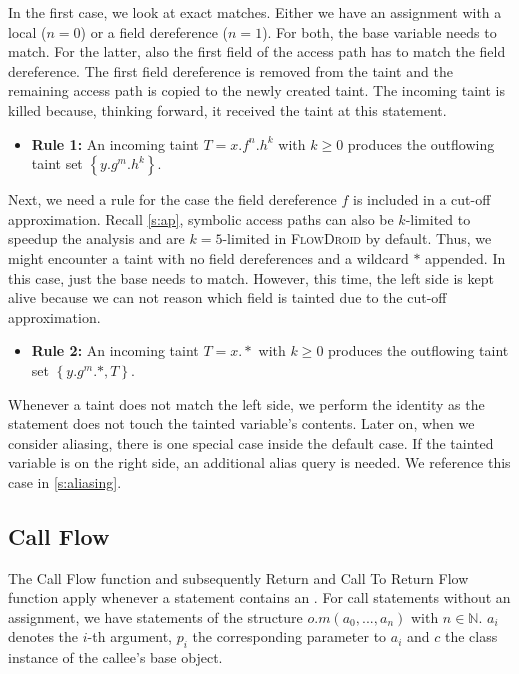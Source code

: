 \documentclass[../draft.tex]{subfiles}
\begin{document}
    In the first case, we look at exact matches. Either we have an assignment with a local ($n=0$) or a field dereference ($n=1$). For both, the base variable needs to match. For the latter, also the first field of the access path has to match the field dereference.
    The first field dereference is removed from the taint and the remaining access path is copied to the newly created taint. The incoming taint is killed because, thinking forward, it received the taint at this statement.
    \begin{itemize}
        \item[] \textbf{Rule 1:} An incoming taint $T = x.f^n.h^k$ with $k \geq 0$ produces the outflowing taint set $\left\{y.g^m.h^k\right\}$.
    \end{itemize}

    Next, we need a rule for the case the field dereference $f$ is included in a cut-off approximation.
    Recall \autoref{s:ap}, symbolic access paths can also be $k$-limited to speedup the analysis and are $k=5$-limited in \textsc{FlowDroid} by default.
    Thus, we might encounter a taint with no field dereferences and a wildcard $*$ appended.
    In this case, just the base needs to match.
    However, this time, the left side is kept alive because we can not reason which field is tainted due to the cut-off approximation.
    \begin{itemize}
        \item[] \textbf{Rule 2:} An incoming taint $T = x.*$ with $k \geq 0$ produces the outflowing taint set $\left\{y.g^m.*, T\right\}$.
    \end{itemize}

    Whenever a taint does not match the left side, we perform the identity as the statement does not touch the tainted variable's contents.
    Later on, when we consider aliasing, there is one special case inside the default case.
    If the tainted variable is on the right side, an additional alias query is needed.
    We reference this case in \autoref{s:aliasing}.

    \subsection{Call Flow}
    The Call Flow function and subsequently Return and Call To Return Flow function apply whenever a statement contains an .
    For call statements without an assignment, we have statements of the structure $o.m(a_0, ..., a_n)$ with $n \in \mathbb{N}$. $a_i$ denotes the $i$-th argument, $p_i$ the corresponding parameter to $a_i$ and $c$ the class instance of the callee's base object.
\end{document}
